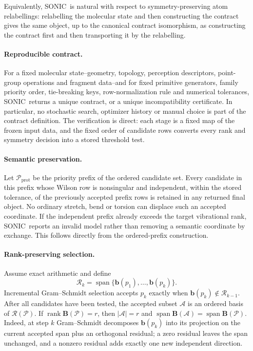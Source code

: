 \documentclass[journal=jctcce,manuscript=article,layout=traditional]{achemso}
\newcommand{\SONIC}{SONIC}
\newcommand{\Bmat}{\mathbf{B}}
\newcommand{\bmat}{\mathbf{b}}
\theoremstyle{definition}
\begin{document}
Equivalently, \SONIC\ is natural with respect to symmetry-preserving atom
relabellings: relabelling the molecular state and then constructing the
contract gives the same object, up to the canonical contract isomorphism, as
constructing the contract first and then transporting it by the relabelling.

\paragraph{Reproducible contract.}
\label{prop:determinism}
For a fixed molecular state--geometry, topology, perception descriptors, point-group
operations and fragment data--and for fixed primitive generators, family
priority order, tie-breaking keys, row-normalization rule and numerical
tolerances, \SONIC\ returns a unique contract, or a unique
incompatibility certificate.  In particular, no stochastic search, optimizer
history or manual choice is part of the contract definition.
The verification is direct: each stage is a fixed map of the frozen
input data, and the fixed order of candidate rows converts every rank and
symmetry decision into a stored threshold test.

\paragraph{Semantic preservation.}
\label{prop:protected}
Let \(\mathcal{P}_{\mathrm{prot}}\) be the priority prefix of the ordered
candidate set.  Every candidate in this prefix whose Wilson row is nonsingular
and independent, within the stored tolerance, of the previously accepted prefix
rows is retained in any returned final object.  No ordinary stretch, bend or
torsion can displace such an accepted coordinate.  If the independent prefix
already exceeds the target vibrational rank, \SONIC\ reports an invalid model
rather than removing a semantic coordinate by exchange.  This follows directly
from the ordered-prefix construction.

\paragraph{Rank-preserving selection.}
\label{prop:rank-selection}
Assume exact arithmetic and define
\[
  \mathcal{R}_k=\operatorname{span}\{\bmat(p_1),\ldots,\bmat(p_k)\}.
\]
Incremental Gram--Schmidt selection accepts \(p_k\) exactly when
\(\bmat(p_k)\notin\mathcal{R}_{k-1}\).  After all candidates have been tested,
the accepted subset \(\mathcal{A}\) is an ordered basis of
\(\mathcal{R}(\mathcal{P})\).  If
\(\operatorname{rank}\Bmat(\mathcal{P})=r\), then
\(|\mathcal{A}|=r\) and
\(\operatorname{span}\Bmat(\mathcal{A})=\operatorname{span}\Bmat(\mathcal{P})\).
Indeed, at step \(k\) Gram--Schmidt decomposes \(\bmat(p_k)\) into its
projection on the current accepted span plus an orthogonal residual; a zero
residual leaves the span unchanged, and a nonzero residual adds exactly one
new independent direction.
\end{document}
